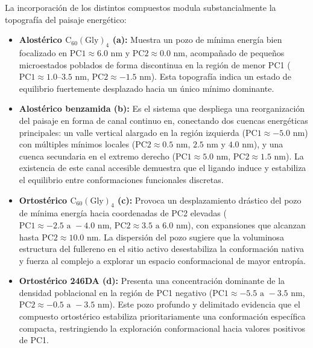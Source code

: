 \begin{table}[htbp]
La incorporación de los distintos compuestos modula substancialmente la topografía del paisaje energético:

\begin{itemize}
    \item \textbf{Alostérico $\text{C}_{60}(\text{Gly})_4$ (a):} Muestra un pozo de mínima energía bien focalizado en $\text{PC1} \approx 6.0\text{ nm}$ y $\text{PC2} \approx 0.0\text{ nm}$, acompañado de pequeños microestados poblados de forma discontinua en la región de menor PC1 ($\text{PC1} \approx 1.0\text{--}3.5\text{ nm}$, $\text{PC2} \approx -1.5\text{ nm}$). Esta topografía indica un estado de equilibrio fuertemente desplazado hacia un único mínimo dominante.
    
    \item \textbf{Alostérico benzamida (b):} Es el sistema que despliega una reorganización del paisaje en forma de canal continuo en, conectando dos cuencas energéticas principales: un valle vertical alargado en la región izquierda ($\text{PC1} \approx -5.0\text{ nm}$) con múltiples mínimos locales ($\text{PC2} \approx 0.5\text{ nm}$, $2.5\text{ nm}$ y $4.0\text{ nm}$), y una cuenca secundaria en el extremo derecho ($\text{PC1} \approx 5.0\text{ nm}$, $\text{PC2} \approx 1.5\text{ nm}$). La existencia de este canal accesible demuestra que el ligando induce y estabiliza el equilibrio entre conformaciones funcionales discretas.
    
    \item \textbf{Ortostérico $\text{C}_{60}(\text{Gly})_4$ (c):} Provoca un desplazamiento drástico del pozo de mínima energía hacia coordenadas de PC2 elevadas ($\text{PC1} \approx -2.5\text{ a }-4.0\text{ nm}$, $\text{PC2} \approx 3.5\text{ a }6.0\text{ nm}$), con expansiones que alcanzan hasta $\text{PC2} \approx 10.0\text{ nm}$. La dispersión del pozo sugiere que la voluminosa estructura del fullereno en el sitio activo desestabiliza la conformación nativa y fuerza al complejo a explorar un espacio conformacional de mayor entropía.
    
    \item \textbf{Ortostérico 246DA (d):} Presenta una concentración dominante de la densidad poblacional en la región de PC1 negativo ($\text{PC1} \approx -5.5\text{ a }-3.5\text{ nm}$, $\text{PC2} \approx -0.5\text{ a }-3.5\text{ nm}$). Este pozo profundo y delimitado evidencia que el compuesto ortostérico estabiliza prioritariamente una conformación específica compacta, restringiendo la exploración conformacional hacia valores positivos de PC1.
\end{itemize}





\end{table}
